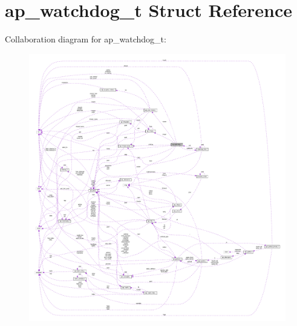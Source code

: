 \hypertarget{structap__watchdog__t}{}\section{ap\+\_\+watchdog\+\_\+t Struct Reference}
\label{structap__watchdog__t}


Collaboration diagram for ap\+\_\+watchdog\+\_\+t\+:
\nopagebreak
\begin{figure}[H]
\begin{center}
\leavevmode
\includegraphics[width=350pt]{structap__watchdog__t__coll__graph}
\end{center}
\end{figure}
